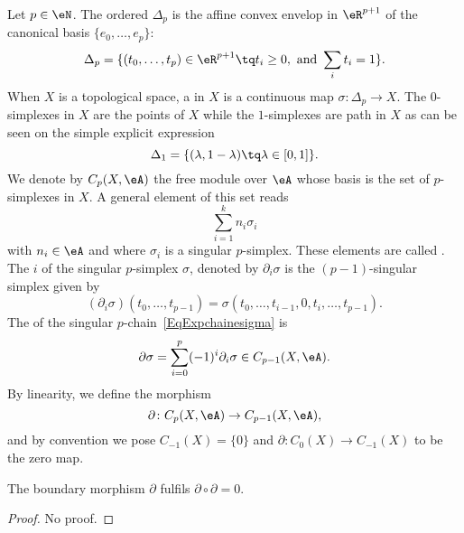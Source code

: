 Let $p\in\eN$. The ordered  $\Delta_p$ is the affine convex envelop in $\eR^{p+1}$ of the canonical basis $\{ e_0,\ldots,e_p \}$:
\begin{equation}
	\Delta_p=\{ (t_0,\ldots,t_p)\in\eR^{p+1}\tq t_i\geq 0,\text{ and }\sum_it_i=1 \}.
\end{equation}
When $X$ is a topological space, a  in $X$ is a continuous map $\sigma\colon \Delta_p\to X$. The $0$-simplexes in $X$ are the points of $X$ while the $1$-simplexes are path in $X$ as can be seen on the simple explicit expression
\[
  \Delta_1=\{ (\lambda,1-\lambda)\tq\lambda\in[0,1] \}.
\]
We denote by $C_p(X,\eA)$ the free module over $\eA$ whose basis is the set of $p$-simplexes in $X$. A general element of this set reads
\begin{equation}		\label{EqExpchainesigma}
  \sum_{i=1}^kn_i\sigma_i
\end{equation}
with $n_i\in\eA$ and where $\sigma_i$ is a singular $p$-simplex. These elements are called . The  $i$ of the singular $p$-simplex $\sigma$, denoted by $\partial_i\sigma$ is the $(p-1)$-singular simplex given by
\[
  (\partial_i\sigma)(t_0,\ldots,t_{p-1})=\sigma(t_0,\ldots,t_{i-1},0,t_i,\ldots,t_{p-1}).
\]
The  of the singular $p$-chain~\ref{EqExpchainesigma} is
\begin{equation}
	\partial\sigma=\sum_{i=0}^p(-1)^i\partial_i\sigma\in C_{p-1}(X,\eA).
\end{equation}
By linearity, we define the morphism
\begin{equation}
\partial\colon C_{p}(X,\eA)\to C_{p-1}(X,\eA),
\end{equation}
and by convention we pose $C_{-1}(X)=\{ 0 \}$ and $\partial\colon C_0(X)\to C_{-1}(X)$ to be the zero map.

\begin{lemma}
The boundary morphism $\partial$ fulfils $\partial\circ\partial =0$.
\end{lemma}

\begin{proof}
No proof.
\end{proof}

